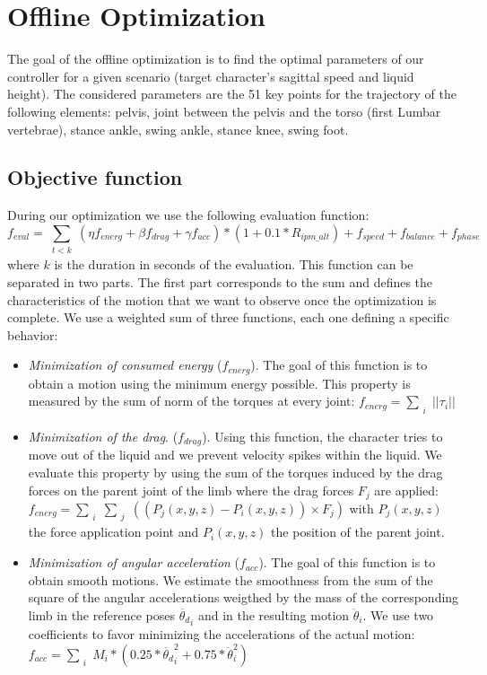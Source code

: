 \documentclass[runningheads,a4paper,10pt]{llncs}
\begin{document}
\section{Offline Optimization}
\label{sec:optimisation}

The goal of the offline optimization is to find the optimal parameters of our controller for a given scenario (target character's sagittal speed and liquid height). The considered parameters are the 51 key points for the trajectory of the following elements: pelvis, joint between the pelvis and the torso (first Lumbar vertebrae), stance ankle, swing ankle, stance knee, swing foot.

\subsection{Objective function}
During our optimization we use the following evaluation function:
\begin{equation}
f_{eval} =\sum_{\substack{t<k}} (\eta f_{energ} + \beta f_{drag} + \gamma f_{acc}) *(1+0.1* R_{ipm\_alt}) 
+ f_{speed} + f_{balance} + f_{phase}
\label{eq:complete_eval}
\end{equation}
where $k$ is the duration in seconds of the evaluation. This function can be separated in two parts. The first part corresponds to the sum and defines the characteristics of the motion that we want to observe once the optimization is complete. We use a weighted sum of three functions, each one defining a specific behavior:
\begin{itemize}
\item{\textit{Minimization of consumed energy} ($f_{energ}$). The goal of this function is to obtain a motion using the minimum energy possible. This property is measured by the sum of norm of the torques at every joint: $f_{energ}=\sum_{\substack{i}}{|| \tau_i ||}$} 
\item{\textit{Minimization of the drag}. ($f_{drag}$). Using this function, the character tries to move out of the liquid and we prevent velocity spikes within the liquid. We evaluate this property by using the sum of the torques induced by the drag forces on the parent joint of the limb where the drag forces $F_j$ are applied: $f_{energ}=\sum_{\substack{i}}\sum_{\substack{j}}((P_j(x,y,z)-P_i(x,y,z)) \times F_j)$ with  $P_j(x,y,z)$ the force application point and $P_i(x,y,z)$ the position of the parent joint.}
\item{\textit{Minimization of angular acceleration} ($f_{acc}$). The goal of this function is to obtain smooth motions. We estimate the smoothness from the sum of the square of the angular accelerations weigthed by the mass of the corresponding limb in the reference poses $\ddot{\theta_d}_i$ and in the resulting motion $\ddot{\theta}_i$. We use two coefficients to favor minimizing the accelerations of the actual motion: $f_{acc}=\sum_{\substack{i}}M_i*(0.25*\ddot{\theta_d}_i^2+0.75*\ddot{\theta}_i^2)$ }
\end{itemize}
\end{document}
